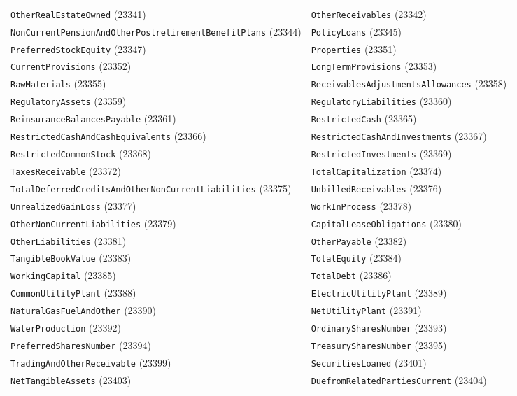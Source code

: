 \documentclass[11pt,a4paper]{report}
\begin{document}
\begin{subappendices}
{\begin{longtable}{@{}p{}p{}@{}}
\texttt{OtherRealEstateOwned} (23341) & \texttt{OtherReceivables} (23342) \\
\texttt{NonCurrentPensionAndOtherPostretirementBenefitPlans} (23344) & \texttt{PolicyLoans} (23345) \\
\texttt{PreferredStockEquity} (23347) & \texttt{Properties} (23351) \\
\texttt{CurrentProvisions} (23352) & \texttt{LongTermProvisions} (23353) \\
\texttt{RawMaterials} (23355) & \texttt{ReceivablesAdjustmentsAllowances} (23358) \\
\texttt{RegulatoryAssets} (23359) & \texttt{RegulatoryLiabilities} (23360) \\
\texttt{ReinsuranceBalancesPayable} (23361) & \texttt{RestrictedCash} (23365) \\
\texttt{RestrictedCashAndCashEquivalents} (23366) & \texttt{RestrictedCashAndInvestments} (23367) \\
\texttt{RestrictedCommonStock} (23368) & \texttt{RestrictedInvestments} (23369) \\
\texttt{TaxesReceivable} (23372) & \texttt{TotalCapitalization} (23374) \\
\texttt{TotalDeferredCreditsAndOtherNonCurrentLiabilities} (23375) & \texttt{UnbilledReceivables} (23376) \\
\texttt{UnrealizedGainLoss} (23377) & \texttt{WorkInProcess} (23378) \\
\texttt{OtherNonCurrentLiabilities} (23379) & \texttt{CapitalLeaseObligations} (23380) \\
\texttt{OtherLiabilities} (23381) & \texttt{OtherPayable} (23382) \\
\texttt{TangibleBookValue} (23383) & \texttt{TotalEquity} (23384) \\
\texttt{WorkingCapital} (23385) & \texttt{TotalDebt} (23386) \\
\texttt{CommonUtilityPlant} (23388) & \texttt{ElectricUtilityPlant} (23389) \\
\texttt{NaturalGasFuelAndOther} (23390) & \texttt{NetUtilityPlant} (23391) \\
\texttt{WaterProduction} (23392) & \texttt{OrdinarySharesNumber} (23393) \\
\texttt{PreferredSharesNumber} (23394) & \texttt{TreasurySharesNumber} (23395) \\
\texttt{TradingAndOtherReceivable} (23399) & \texttt{SecuritiesLoaned} (23401) \\
\texttt{NetTangibleAssets} (23403) & \texttt{DuefromRelatedPartiesCurrent} (23404) \\

\end{longtable}}
\end{subappendices}
\end{document}
